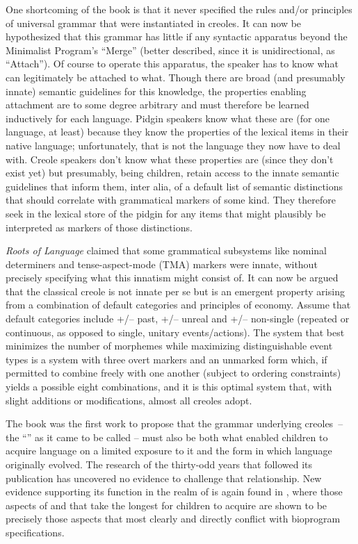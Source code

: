 One shortcoming of the book is that it never specified the rules and/or principles of universal grammar that were instantiated in creoles. It can now be hypothesized that this grammar has little if any syntactic apparatus beyond the Minimalist Program’s “Merge” (better described, since it is unidirectional, as “Attach”). Of course to operate this apparatus, the speaker has to know what can legitimately be attached to what. Though there are broad (and presumably innate) semantic guidelines for this knowledge, the properties enabling attachment are to some degree arbitrary and must therefore be learned inductively for each language. Pidgin speakers know what these are (for one language, at least) because they know the properties of the lexical items in their native language; unfortunately, that is not the language they now have to deal with. Creole speakers don’t know what these properties are (since they don’t exist yet) but presumably, being children, retain access to the innate semantic guidelines that inform them, inter alia, of a default list of semantic distinctions that should correlate with grammatical markers of some kind. They therefore seek in the lexical store of the pidgin for any items that might plausibly be interpreted as markers of those distinctions.

\textit{Roots of Language} claimed that some grammatical subsystems like nominal determiners and tense-aspect-mode (TMA) markers were innate, without precisely specifying what this innatism might consist of. It can now be argued that the classical creole  is not innate per se but is an emergent property arising from a combination of default categories and principles of economy. Assume that default categories include +/– past, +/– unreal and +/– non-single (repeated or continuous, as opposed to single, unitary events/actions). The system that best minimizes the number of morphemes while maximizing distinguishable event types is a system with three overt markers and an unmarked form which, if permitted to combine freely with one another (subject to ordering constraints) yields a possible eight combinations, and it is this optimal system that, with slight additions or modifications, almost all creoles adopt.

The book was the first work to propose that the grammar underlying creoles~-- the “” as it came to be called -- must also be both what enabled children to acquire language on a limited exposure to it and the form in which language originally evolved. The research of the thirty-odd years that followed its publication has uncovered no evidence to challenge that relationship. New evidence supporting its function in the realm of is again found in \citet[Chapter 7]{Bickerton2014}, where those aspects of  and  that take the longest  for children to acquire are shown to be precisely those aspects that most clearly and directly conflict with bioprogram specifications.

